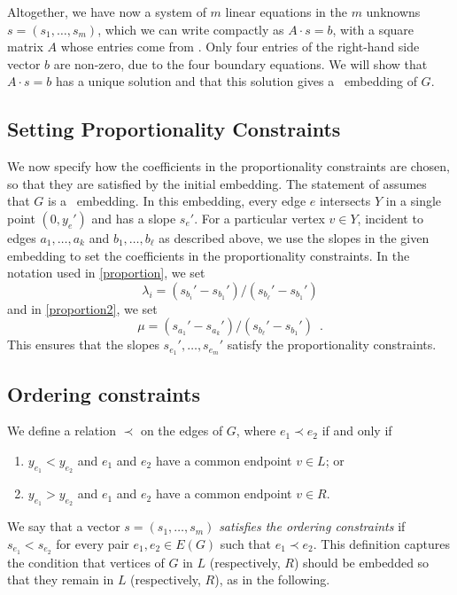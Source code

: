 Altogether, we have now a system of $m$ linear equations
in the $m$ unknowns $s=(s_1,\ldots,s_m)$, which we can write
compactly as
$A\cdot s = b$, with a square matrix $A$ whose entries come from
\thetag{\ref{eq:slope0}--\ref{eq:proportion2}}.
Only four entries of
the right-hand side vector
$b$
are non-zero, due to the four boundary equations.
We will show that $A\cdot s=b$ has a unique
solution and that this solution gives a \Fary\ embedding of $G$.

\subsection{Setting Proportionality Constraints}


We now specify how the coefficients in the proportionality constraints
are chosen, so that they are satisfied by the initial embedding.  The statement of  assumes that $G$ is a \Fary\ embedding.  In this embedding, every edge $e$ intersects $Y$
in a single point $(0,y_e')$ and has a slope $s_e'$.  For a particular
vertex $v\in Y$, incident to edges $a_1,\ldots,a_k$ and $b_1,\ldots,b_\ell$
as described above, we use the slopes in the given embedding to set the
coefficients in the proportionality constraints.  In the notation used
in \eqref{proportion}, we set
\[
\lambda_i = (s_{b_i}'-s_{b_1}')/(s_{b_\ell}'-s_{b_1}') 
\]
and in \eqref{proportion2}, we set
\[
\mu = (s_{a_1}'-s_{a_k}')/(s_{b_\ell}'-s_{b_1}') \enspace .
\]
This ensures that the slopes $s_{e_1}',\ldots,s_{e_m}'$ satisfy the
proportionality constraints.


\subsection{Ordering constraints}

We define a relation $\prec$ on the edges of $G$, where $e_1 \prec e_2$ if and only if
\begin{enumerate}
	\item $y_{e_1} < y_{e_2}$ and $e_1$ and $e_2$ have a common endpoint $v\in L$; or
	\item $y_{e_1} > y_{e_2}$ and $e_1$ and $e_2$ have a common endpoint $v\in R$.
\end{enumerate}
We say that a vector $s=(s_1,\ldots,s_m)$ \emph{satisfies the ordering
	constraints} if $s_{e_1} < s_{e_2}$ for every pair $e_1,e_2\in E(G)$
such that $e_1\prec e_2$. This definition captures the condition that vertices of $G$ in $L$ (respectively, $R$) should be embedded so that they remain in $L$ (respectively, $R$), as in the following. 

